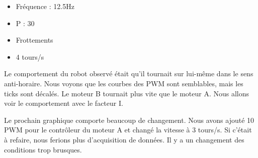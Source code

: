 \documentclass[
	a4paper,									%
	11pt,										%
	twoside,									%
	openright,									%
	notitlepage,									%
	parskip=half,								%
]{scrreprt}										%
\begin{document}
\begin{center}
    
    
    \begin{itemize}
        \item Fréquence : 12.5Hz
        \item P : 30
        \item Frottements
        \item 4 tours/s
    \end{itemize}
    \end{center}

Le comportement du robot observé était qu'il tournait sur lui-même dans le sens anti-horaire. Nous voyons que les courbes des PWM sont semblables, 
mais les ticks sont décalés. Le moteur B tournait plus vite que le moteur A. Nous allons voir le comportement avec le facteur I. \par

Le prochain graphique comporte beaucoup de changement. Nous avons ajouté 10 PWM pour le contrôleur du moteur A et changé la vitesse 
à 3 tours/s. Si c'était à refaire, nous ferions plus d'acquisition de données. Il y a un changement des conditions trop brusques. \par
\end{document}
